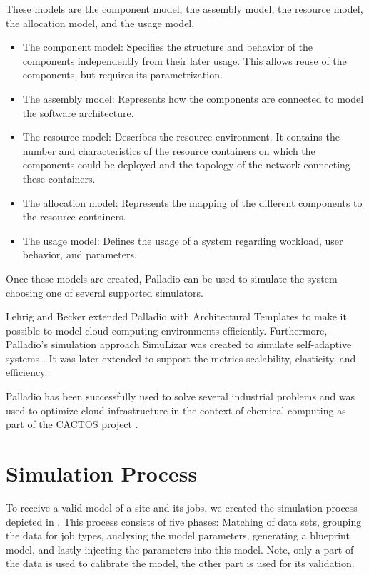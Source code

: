 \documentclass[a4paper]{jpconf}
\begin{document}
These models are the component model, the assembly model, the resource model, the allocation model, and the usage model.
\begin{itemize}
	\item The component model: Specifies the structure and behavior of the components independently from their later usage. This allows reuse of the components, but requires its parametrization.
	\item The assembly model: Represents how the components are connected to model the software architecture.
	\item The resource model: Describes the resource environment. It contains the number and characteristics of the resource containers on which the components could be deployed and the topology of the network connecting these containers.
	\item The allocation model: Represents the mapping of the different components to the resource containers.
	\item The usage model: Defines the usage of a system regarding workload, user behavior, and parameters.
	
\end{itemize}
Once these models are created, Palladio can be used to simulate the system choosing one of several supported simulators. 

Lehrig and Becker \cite{arch} extended Palladio with Architectural Templates to make it possible to model cloud computing environments efficiently.
Furthermore, Palladio's simulation approach SimuLizar was created to simulate self-adaptive systems \cite{becker2013simulizar}.
It was later extended to support the metrics scalability, elasticity, and efficiency.

Palladio has been successfully used to solve several industrial problems and was used to optimize cloud infrastructure in the context of chemical computing as part of the CACTOS project \cite{rapidtesting}. 

\section{Simulation Process}
\label{sec:process}
To receive a valid model of a site and its jobs, we created the simulation process depicted in . This process consists of five phases: Matching of data sets, grouping the data for job types, analysing the model parameters, generating a blueprint model, and lastly injecting the parameters into this model. Note, only a part of the data is used to calibrate the model, the other part is used for its validation.
\end{document}
